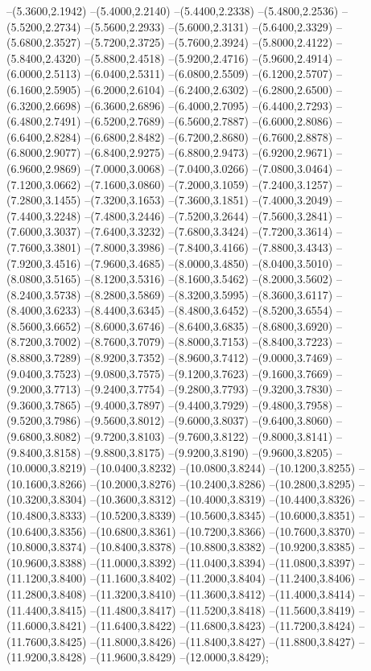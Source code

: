 {	--(5.3600,2.1942)
	--(5.4000,2.2140)
	--(5.4400,2.2338)
	--(5.4800,2.2536)
	--(5.5200,2.2734)
	--(5.5600,2.2933)
	--(5.6000,2.3131)
	--(5.6400,2.3329)
	--(5.6800,2.3527)
	--(5.7200,2.3725)
	--(5.7600,2.3924)
	--(5.8000,2.4122)
	--(5.8400,2.4320)
	--(5.8800,2.4518)
	--(5.9200,2.4716)
	--(5.9600,2.4914)
	--(6.0000,2.5113)
	--(6.0400,2.5311)
	--(6.0800,2.5509)
	--(6.1200,2.5707)
	--(6.1600,2.5905)
	--(6.2000,2.6104)
	--(6.2400,2.6302)
	--(6.2800,2.6500)
	--(6.3200,2.6698)
	--(6.3600,2.6896)
	--(6.4000,2.7095)
	--(6.4400,2.7293)
	--(6.4800,2.7491)
	--(6.5200,2.7689)
	--(6.5600,2.7887)
	--(6.6000,2.8086)
	--(6.6400,2.8284)
	--(6.6800,2.8482)
	--(6.7200,2.8680)
	--(6.7600,2.8878)
	--(6.8000,2.9077)
	--(6.8400,2.9275)
	--(6.8800,2.9473)
	--(6.9200,2.9671)
	--(6.9600,2.9869)
	--(7.0000,3.0068)
	--(7.0400,3.0266)
	--(7.0800,3.0464)
	--(7.1200,3.0662)
	--(7.1600,3.0860)
	--(7.2000,3.1059)
	--(7.2400,3.1257)
	--(7.2800,3.1455)
	--(7.3200,3.1653)
	--(7.3600,3.1851)
	--(7.4000,3.2049)
	--(7.4400,3.2248)
	--(7.4800,3.2446)
	--(7.5200,3.2644)
	--(7.5600,3.2841)
	--(7.6000,3.3037)
	--(7.6400,3.3232)
	--(7.6800,3.3424)
	--(7.7200,3.3614)
	--(7.7600,3.3801)
	--(7.8000,3.3986)
	--(7.8400,3.4166)
	--(7.8800,3.4343)
	--(7.9200,3.4516)
	--(7.9600,3.4685)
	--(8.0000,3.4850)
	--(8.0400,3.5010)
	--(8.0800,3.5165)
	--(8.1200,3.5316)
	--(8.1600,3.5462)
	--(8.2000,3.5602)
	--(8.2400,3.5738)
	--(8.2800,3.5869)
	--(8.3200,3.5995)
	--(8.3600,3.6117)
	--(8.4000,3.6233)
	--(8.4400,3.6345)
	--(8.4800,3.6452)
	--(8.5200,3.6554)
	--(8.5600,3.6652)
	--(8.6000,3.6746)
	--(8.6400,3.6835)
	--(8.6800,3.6920)
	--(8.7200,3.7002)
	--(8.7600,3.7079)
	--(8.8000,3.7153)
	--(8.8400,3.7223)
	--(8.8800,3.7289)
	--(8.9200,3.7352)
	--(8.9600,3.7412)
	--(9.0000,3.7469)
	--(9.0400,3.7523)
	--(9.0800,3.7575)
	--(9.1200,3.7623)
	--(9.1600,3.7669)
	--(9.2000,3.7713)
	--(9.2400,3.7754)
	--(9.2800,3.7793)
	--(9.3200,3.7830)
	--(9.3600,3.7865)
	--(9.4000,3.7897)
	--(9.4400,3.7929)
	--(9.4800,3.7958)
	--(9.5200,3.7986)
	--(9.5600,3.8012)
	--(9.6000,3.8037)
	--(9.6400,3.8060)
	--(9.6800,3.8082)
	--(9.7200,3.8103)
	--(9.7600,3.8122)
	--(9.8000,3.8141)
	--(9.8400,3.8158)
	--(9.8800,3.8175)
	--(9.9200,3.8190)
	--(9.9600,3.8205)
	--(10.0000,3.8219)
	--(10.0400,3.8232)
	--(10.0800,3.8244)
	--(10.1200,3.8255)
	--(10.1600,3.8266)
	--(10.2000,3.8276)
	--(10.2400,3.8286)
	--(10.2800,3.8295)
	--(10.3200,3.8304)
	--(10.3600,3.8312)
	--(10.4000,3.8319)
	--(10.4400,3.8326)
	--(10.4800,3.8333)
	--(10.5200,3.8339)
	--(10.5600,3.8345)
	--(10.6000,3.8351)
	--(10.6400,3.8356)
	--(10.6800,3.8361)
	--(10.7200,3.8366)
	--(10.7600,3.8370)
	--(10.8000,3.8374)
	--(10.8400,3.8378)
	--(10.8800,3.8382)
	--(10.9200,3.8385)
	--(10.9600,3.8388)
	--(11.0000,3.8392)
	--(11.0400,3.8394)
	--(11.0800,3.8397)
	--(11.1200,3.8400)
	--(11.1600,3.8402)
	--(11.2000,3.8404)
	--(11.2400,3.8406)
	--(11.2800,3.8408)
	--(11.3200,3.8410)
	--(11.3600,3.8412)
	--(11.4000,3.8414)
	--(11.4400,3.8415)
	--(11.4800,3.8417)
	--(11.5200,3.8418)
	--(11.5600,3.8419)
	--(11.6000,3.8421)
	--(11.6400,3.8422)
	--(11.6800,3.8423)
	--(11.7200,3.8424)
	--(11.7600,3.8425)
	--(11.8000,3.8426)
	--(11.8400,3.8427)
	--(11.8800,3.8427)
	--(11.9200,3.8428)
	--(11.9600,3.8429)
	--(12.0000,3.8429);
}
